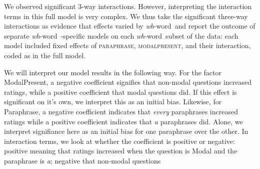 \documentclass[12pt,letterpaper,table,svgnames,dvipsnames]{article}
\newcommand{\jd}[1]{\textcolor{Purple}{[jd: #1]}}
\newcommand{\whw}{\emph{wh}-word~}
\begin{document}
We observed significant 3-way interactions. However, interpreting the interaction terms in this full model is very complex. We thus take the significant three-way interactions as evidence that effects varied by \whw and report the outcome of separate \whw-specific models on each \whw subset of the data: each model included fixed effects of \textsc{paraphrase}, \textsc{modalpresent}, and their interaction, coded as in the full model. 

We will interpret our model results in the following way. For the factor ModalPresent, a negative coefficient signifies that non-modal questions increased ratings, while a positive coefficient that modal questions did. If this effect is significant on it's own, we interpret this as an initial bias. Likewise, for Paraphrase, a negative coefficient indicates that \emph{every} paraphrases increased ratings while a positive coefficient indicates that \emph{a} paraphrases did. Alone, we interpret signifiance here as an initial bias for one paraphrase over the other. In interaction terms, we look at whether the coefficient is positive or negative: positive meaning that ratings increased when the question is Modal and the paraphrase is \emph{a}; negative that non-modal questions 
\end{document}
